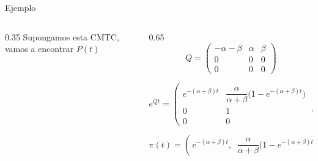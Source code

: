 \documentclass[aspectratio=1610, 9pt]{beamer}
\begin{document}
\begin{frame}{Ejemplo}
\begin{columns}
\begin{column}{0.35\textwidth}
Supongamos esta CMTC, vamos a encontrar $P(t)$

\begin{center}
\end{center}
\end{column}
\begin{column}{0.65\textwidth}
\[
Q = \begin{pmatrix} -\alpha-\beta & \alpha & \beta \\ 0 & 0 & 0 \\ 0 & 0 & 0 \end{pmatrix}
\]

\[
e^{Qt} = \begin{pmatrix}
e^{-(\alpha+\beta)t} & \dfrac{\alpha}{\alpha+\beta}\bigl(1-e^{-(\alpha+\beta)t}\bigr) & \dfrac{\beta}{\alpha+\beta}\bigl(1-e^{-(\alpha+\beta)t}\bigr) \\[8pt]
0 & 1 & 0 \\[4pt]
0 & 0 & 1
\end{pmatrix}
\]

\medskip
\small
\[
\pi(t) = \left(\, e^{-(\alpha+\beta)t},\;\; \frac{\alpha}{\alpha+\beta}\bigl(1-e^{-(\alpha+\beta)t}\bigr),\;\; \frac{\beta}{\alpha+\beta}\bigl(1-e^{-(\alpha+\beta)t}\bigr) \,\right)
\]
\end{column}
\end{columns}
\end{frame}
\end{document}
